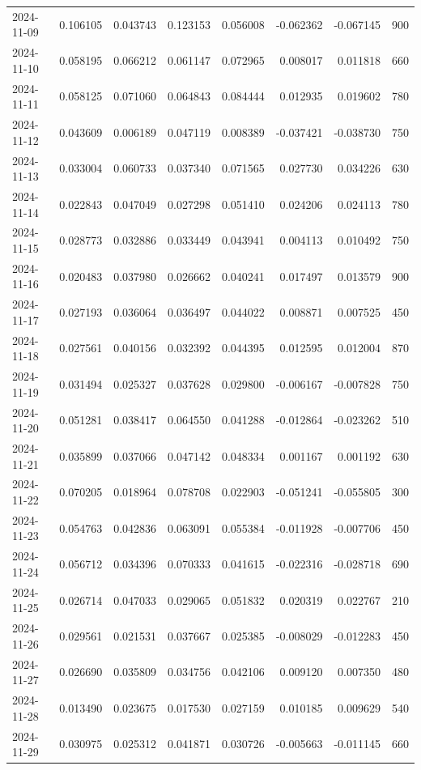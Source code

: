 \begin{tabular}{lrrrrrrr}
2024-11-09 & 0.106105 & 0.043743 & 0.123153 & 0.056008 & -0.062362 & -0.067145 & 900 \\
2024-11-10 & 0.058195 & 0.066212 & 0.061147 & 0.072965 & 0.008017 & 0.011818 & 660 \\
2024-11-11 & 0.058125 & 0.071060 & 0.064843 & 0.084444 & 0.012935 & 0.019602 & 780 \\
2024-11-12 & 0.043609 & 0.006189 & 0.047119 & 0.008389 & -0.037421 & -0.038730 & 750 \\
2024-11-13 & 0.033004 & 0.060733 & 0.037340 & 0.071565 & 0.027730 & 0.034226 & 630 \\
2024-11-14 & 0.022843 & 0.047049 & 0.027298 & 0.051410 & 0.024206 & 0.024113 & 780 \\
2024-11-15 & 0.028773 & 0.032886 & 0.033449 & 0.043941 & 0.004113 & 0.010492 & 750 \\
2024-11-16 & 0.020483 & 0.037980 & 0.026662 & 0.040241 & 0.017497 & 0.013579 & 900 \\
2024-11-17 & 0.027193 & 0.036064 & 0.036497 & 0.044022 & 0.008871 & 0.007525 & 450 \\
2024-11-18 & 0.027561 & 0.040156 & 0.032392 & 0.044395 & 0.012595 & 0.012004 & 870 \\
2024-11-19 & 0.031494 & 0.025327 & 0.037628 & 0.029800 & -0.006167 & -0.007828 & 750 \\
2024-11-20 & 0.051281 & 0.038417 & 0.064550 & 0.041288 & -0.012864 & -0.023262 & 510 \\
2024-11-21 & 0.035899 & 0.037066 & 0.047142 & 0.048334 & 0.001167 & 0.001192 & 630 \\
2024-11-22 & 0.070205 & 0.018964 & 0.078708 & 0.022903 & -0.051241 & -0.055805 & 300 \\
2024-11-23 & 0.054763 & 0.042836 & 0.063091 & 0.055384 & -0.011928 & -0.007706 & 450 \\
2024-11-24 & 0.056712 & 0.034396 & 0.070333 & 0.041615 & -0.022316 & -0.028718 & 690 \\
2024-11-25 & 0.026714 & 0.047033 & 0.029065 & 0.051832 & 0.020319 & 0.022767 & 210 \\
2024-11-26 & 0.029561 & 0.021531 & 0.037667 & 0.025385 & -0.008029 & -0.012283 & 450 \\
2024-11-27 & 0.026690 & 0.035809 & 0.034756 & 0.042106 & 0.009120 & 0.007350 & 480 \\
2024-11-28 & 0.013490 & 0.023675 & 0.017530 & 0.027159 & 0.010185 & 0.009629 & 540 \\
2024-11-29 & 0.030975 & 0.025312 & 0.041871 & 0.030726 & -0.005663 & -0.011145 & 660 \\

\end{tabular}

